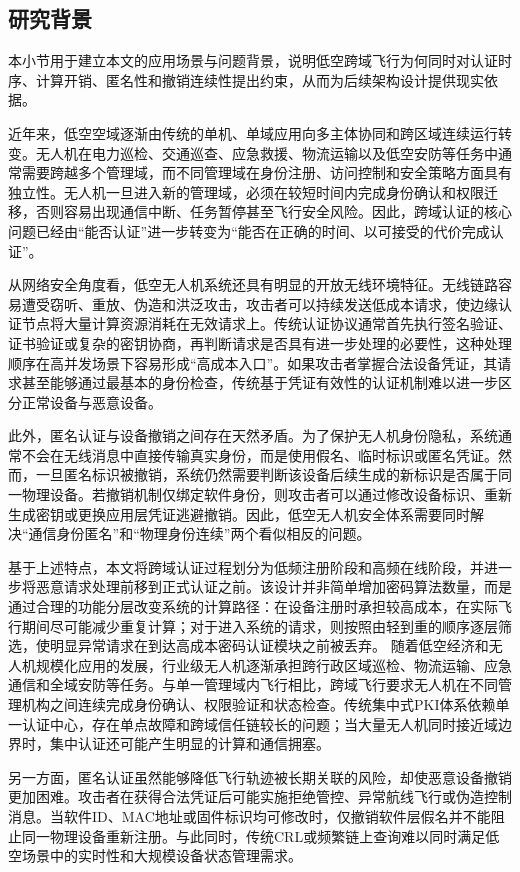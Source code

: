 \documentclass[conference]{IEEEtran}
\begin{document}
	
	\subsection{研究背景}
	
	本小节用于建立本文的应用场景与问题背景，说明低空跨域飞行为何同时对认证时序、计算开销、匿名性和撤销连续性提出约束，从而为后续架构设计提供现实依据。
	
	近年来，低空空域逐渐由传统的单机、单域应用向多主体协同和跨区域连续运行转变。无人机在电力巡检、交通巡查、应急救援、物流运输以及低空安防等任务中通常需要跨越多个管理域，而不同管理域在身份注册、访问控制和安全策略方面具有独立性。无人机一旦进入新的管理域，必须在较短时间内完成身份确认和权限迁移，否则容易出现通信中断、任务暂停甚至飞行安全风险。因此，跨域认证的核心问题已经由“能否认证”进一步转变为“能否在正确的时间、以可接受的代价完成认证”。
	
	从网络安全角度看，低空无人机系统还具有明显的开放无线环境特征。无线链路容易遭受窃听、重放、伪造和洪泛攻击，攻击者可以持续发送低成本请求，使边缘认证节点将大量计算资源消耗在无效请求上。传统认证协议通常首先执行签名验证、证书验证或复杂的密钥协商，再判断请求是否具有进一步处理的必要性，这种处理顺序在高并发场景下容易形成“高成本入口”。如果攻击者掌握合法设备凭证，其请求甚至能够通过最基本的身份检查，传统基于凭证有效性的认证机制难以进一步区分正常设备与恶意设备。
	
	此外，匿名认证与设备撤销之间存在天然矛盾。为了保护无人机身份隐私，系统通常不会在无线消息中直接传输真实身份，而是使用假名、临时标识或匿名凭证。然而，一旦匿名标识被撤销，系统仍然需要判断该设备后续生成的新标识是否属于同一物理设备。若撤销机制仅绑定软件身份，则攻击者可以通过修改设备标识、重新生成密钥或更换应用层凭证逃避撤销。因此，低空无人机安全体系需要同时解决“通信身份匿名”和“物理身份连续”两个看似相反的问题。
	
	基于上述特点，本文将跨域认证过程划分为低频注册阶段和高频在线阶段，并进一步将恶意请求处理前移到正式认证之前。该设计并非简单增加密码算法数量，而是通过合理的功能分层改变系统的计算路径：在设备注册时承担较高成本，在实际飞行期间尽可能减少重复计算；对于进入系统的请求，则按照由轻到重的顺序逐层筛选，使明显异常请求在到达高成本密码认证模块之前被丢弃。
	随着低空经济和无人机规模化应用的发展，行业级无人机逐渐承担跨行政区域巡检、物流运输、应急通信和全域安防等任务。与单一管理域内飞行相比，跨域飞行要求无人机在不同管理机构之间连续完成身份确认、权限验证和状态检查。传统集中式PKI体系依赖单一认证中心，存在单点故障和跨域信任链较长的问题；当大量无人机同时接近域边界时，集中认证还可能产生明显的计算和通信拥塞。
	
	另一方面，匿名认证虽然能够降低飞行轨迹被长期关联的风险，却使恶意设备撤销更加困难。攻击者在获得合法凭证后可能实施拒绝管控、异常航线飞行或伪造控制消息。当软件ID、MAC地址或固件标识均可修改时，仅撤销软件层假名并不能阻止同一物理设备重新注册。与此同时，传统CRL或频繁链上查询难以同时满足低空场景中的实时性和大规模设备状态管理需求。
	
\end{document}
